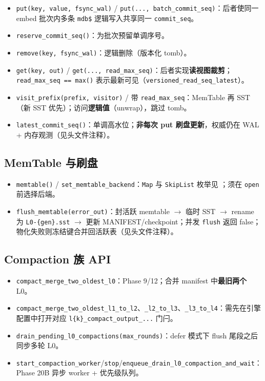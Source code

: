 \begin{itemize}
  \item \texttt{put(key, value, fsync\_wal)} / \texttt{put(..., batch\_commit\_seq)}：后者使同一 embed 批次内多条 \texttt{mdb\$} 逻辑写入共享同一 \texttt{commit\_seq}。
  \item \texttt{reserve\_commit\_seq()}：为批次预留单调序号。
  \item \texttt{remove(key, fsync\_wal)}：逻辑删除（版本化 tomb）。
  \item \texttt{get(key, out)} / \texttt{get(..., read\_max\_seq)}：后者实现\textbf{读视图裁剪}；\texttt{read\_max\_seq == max()} 表示最新可见（\texttt{versioned\_read\_seq\_latest}）。
  \item \texttt{visit\_prefix(prefix, visitor)} / 带 \texttt{read\_max\_seq}：MemTable 再 SST（新 SST 优先）；访问\textbf{逻辑值}（unwrap），跳过 tomb。
  \item \texttt{latest\_commit\_seq()}：单调高水位；\textbf{非每次 put 刷盘更新}，权威仍在 WAL + 内存观测（见头文件注释）。
\end{itemize}

\subsection{MemTable 与刷盘}

\begin{itemize}
  \item \texttt{memtable()} / \texttt{set\_memtable\_backend}：\texttt{Map} 与 \texttt{SkipList} 枚举见 ；须在 \texttt{open} 前选择后端。
  \item \texttt{flush\_memtable(error\_out)}：封活跃 memtable $\rightarrow$ 临时 SST $\rightarrow$ rename 为 \texttt{L0-\{gen\}.sst} $\rightarrow$ 更新 MANIFEST/checkpoint；并发 \texttt{flush} 返回 false；物化失败则冻结键合并回活跃表（见头文件注释）。
\end{itemize}

\subsection{Compaction 族 API}

\begin{itemize}
  \item \texttt{compact\_merge\_two\_oldest\_l0}：Phase 9/12；合并 manifest 中\textbf{最旧两个} L0。
  \item \texttt{compact\_merge\_two\_oldest\_l1\_to\_l2}、\texttt{\_l2\_to\_l3}、\texttt{\_l3\_to\_l4}：需先在引擎配置中打开对应 \texttt{l\{k\}\_compact\_output\_...} 门闩。
  \item \texttt{drain\_pending\_l0\_compactions(max\_rounds)}：defer 模式下 flush 尾段之后同步多轮 L0。
  \item \texttt{start\_compaction\_worker}/\texttt{stop}/\texttt{enqueue\_drain\_l0\_compaction\_and\_wait}：Phase 20B 异步 worker + 优先级队列。
\end{itemize}

